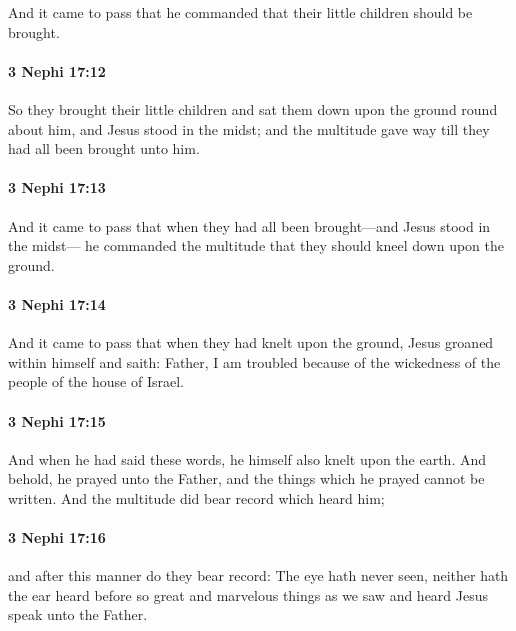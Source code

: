 			And it came to pass that he commanded
			that their little children should be brought.

		\paragraph{3 Nephi 17:12} %
			\label{3NEPHI-17-12}

			So they brought their little children
			and sat them down upon the ground round about him,
			and Jesus stood in the midst;
			and the multitude gave way till they had all been brought unto him.

		\paragraph{3 Nephi 17:13} %
			\label{3NEPHI-17-13}

			And it came to pass that
			when they had all been brought---and Jesus stood in the midst---
			he commanded the multitude that they should kneel down upon the ground.

		\paragraph{3 Nephi 17:14} %
			\label{3NEPHI-17-14}

			And it came to pass that when they had knelt upon the ground,
			Jesus groaned within himself and saith:
			Father, I am troubled
			because of the wickedness of the people of the house of Israel.

		\paragraph{3 Nephi 17:15} %
			\label{3NEPHI-17-15}

			And when he had said these words,
			he himself also knelt upon the earth.
			And behold, he prayed unto the Father,
			and the things which he prayed cannot be written.
			And the multitude did bear record which heard him;

		\paragraph{3 Nephi 17:16} %
			\label{3NEPHI-17-16}

			and after this manner do they bear record:
			The eye hath never seen, neither hath the ear heard before
			so great and marvelous things as we saw and heard Jesus speak unto the Father.

